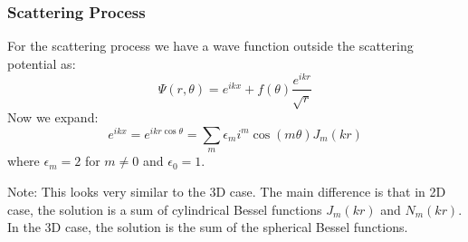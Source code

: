\subsubsection{Scattering Process}

For the scattering process we have a wave function outside the scattering potential as:
\begin{equation}\label{sctPhi}
 \Psi(r,\theta) = e^{ikx} + f(\theta)\frac{e^{ikr}}{\sqrt{r}}
\end{equation}
Now we expand:
\begin{equation}\label{expE}
e^{ikx} = e^{ikr\cos\theta} = \sum_m{\epsilon_m i^m \cos(m\theta)J_m(kr)}
\end{equation}
where $\epsilon_m = 2 $ for $ m \neq 0 $ and $ \epsilon_0 = 1 $.

Note: This looks very similar to the 3D case. The main difference is that in 2D case, the solution is a sum of cylindrical Bessel functions $ J_m(kr) $ and $ N_m(kr) $.
In the 3D case, the solution is the sum of the spherical Bessel functions.

